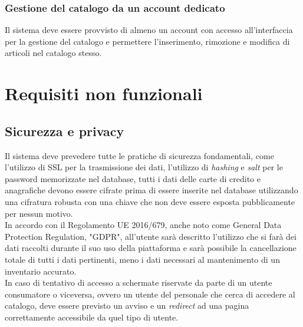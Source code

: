 \documentclass[12pt,a4paper]{article}
\begin{document}
\subsubsection{Gestione del catalogo da un account dedicato}
Il sistema deve essere provvisto di almeno un account con accesso all'interfaccia per la gestione del catalogo e permettere l'inserimento, rimozione e modifica di articoli nel catalogo stesso.

\section{Requisiti non funzionali}
\subsection{Sicurezza e privacy}
\label{sec:security}
Il sistema deve prevedere tutte le pratiche di sicurezza fondamentali, come l'utilizzo di SSL per la trasmissione dei dati, l'utilizzo di \textit{hashing} e \textit{salt} per le password memorizzate nel database, tutti i dati delle carte di credito e anagrafiche devono essere cifrate prima di essere inserite nel database utilizzando una cifratura robusta con una chiave che non deve essere esposta pubblicamente per nessun motivo. \\
In accordo con il Regolamento UE 2016/679, anche noto come General Data Protection Regulation, "GDPR", all'utente sarà descritto l'utilizzo che si farà dei dati raccolti durante il suo uso della piattaforma e sarà possibile la cancellazione totale di tutti i dati pertinenti, meno i dati necessari al mantenimento di un inventario accurato. \\
In caso di tentativo di accesso a schermate riservate da parte di un utente consumatore o viceversa, ovvero un utente del personale che cerca di accedere al catalogo, deve essere previsto un avviso e un \textit{redirect} ad una pagina correttamente accessibile da quel tipo di utente.

\end{document}
